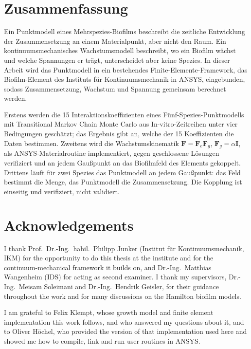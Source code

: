 \documentclass[12pt, a4paper, twoside]{report}
\newcommand{\bF}{\mathbf{F}}
\newcommand{\bI}{\mathbf{I}}
\begin{document}
\chapter*{Zusammenfassung}
Ein Punktmodell eines Mehrspezies-Biofilms beschreibt die zeitliche Entwicklung
der Zusammensetzung an einem Materialpunkt, aber nicht den Raum. Ein
kontinuumsmechanisches Wachstumsmodell beschreibt, wo ein Biofilm wächst und
welche Spannungen er trägt, unterscheidet aber keine Spezies. In dieser Arbeit
wird das Punktmodell in ein bestehendes Finite-Elemente-Framework, das
Biofilm-Element des Instituts für Kontinuumsmechanik in ANSYS, eingebunden,
sodass Zusammensetzung, Wachstum und Spannung gemeinsam berechnet werden.

Erstens werden die 15 Interaktionskoeffizienten eines Fünf-Spezies-Punktmodells
mit Transitional Markov Chain Monte Carlo aus In-vitro-Zeitreihen unter vier
Bedingungen geschätzt; das Ergebnis gibt an, welche der 15 Koeffizienten die
Daten bestimmen. Zweitens wird die Wachstumskinematik
$\bF=\bF_e\bF_g$, $\bF_g=\alpha\bI$, als ANSYS-Materialroutine implementiert,
gegen geschlossene Lösungen verifiziert und an jedem Gaußpunkt an das
Biofilmfeld des Elements gekoppelt. Drittens läuft für zwei Spezies das
Punktmodell an jedem Gaußpunkt: das Feld bestimmt die Menge, das Punktmodell die
Zusammensetzung. Die Kopplung ist einseitig und verifiziert, nicht validiert.
\fi %

\newpage
\chapter*{Acknowledgements}
I thank Prof.\ Dr.-Ing.\ habil.\ Philipp Junker (Institut für
Kontinuumsmechanik, IKM) for the opportunity to do this thesis at the institute
and for the continuum-mechanical framework it builds on, and Dr.-Ing.\ Matthias
Wangenheim (IDS) for acting as second examiner. I thank my supervisors,
Dr.-Ing.\ Meisam Soleimani and Dr.-Ing.\ Hendrik Geisler, for their guidance
throughout the work and for many discussions on the Hamilton biofilm models.

I am grateful to Felix Klempt, whose growth model and finite element
implementation this work follows, and who answered my questions about it, and
to Oliver Höchel, who provided the version of that implementation used here and
showed me how to compile, link and run user routines in ANSYS.
\end{document}
